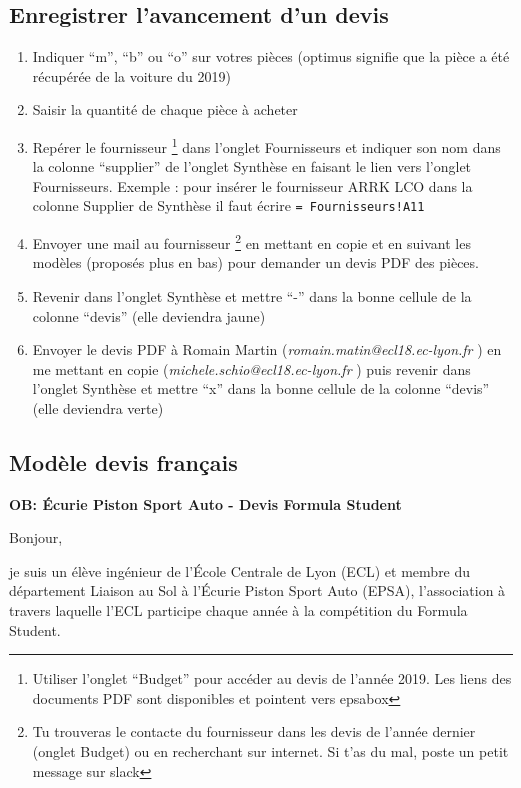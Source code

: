 \subsection{Enregistrer l'avancement d'un devis}
\begin{enumerate}
	\item Indiquer “m”, “b” ou “o” sur votres pièces (optimus signifie que la pièce a été récupérée de la voiture du 2019)
	\item Saisir la quantité de chaque pièce à acheter
	\item Repérer le fournisseur \footnote{Utiliser l’onglet “Budget” pour accéder au devis de l’année 2019. Les liens des documents PDF sont disponibles et pointent vers epsabox} dans l’onglet Fournisseurs et indiquer son nom dans la colonne 	“supplier” de l’onglet Synthèse en faisant le lien vers l’onglet Fournisseurs. Exemple​ : pour insérer le fournisseur ARRK LCO dans la colonne Supplier de Synthèse il faut écrire \texttt{=​ Fournisseurs!A11}
	\item Envoyer une mail au fournisseur \footnote{Tu trouveras le contacte du fournisseur dans les devis de l’année dernier (onglet Budget) ou en recherchant sur internet. Si t’as du mal, poste un petit message sur slack} en mettant en copie et en suivant les modèles (proposés
	plus en bas) pour demander un devis PDF des pièces.
	\item Revenir dans l’onglet Synthèse et mettre “-” dans la bonne cellule de la colonne “devis” (elle deviendra jaune)
\	\item Envoyer le devis PDF à Romain Martin (​\textit{ romain.matin@ecl18.ec-lyon.fr}​ ) en me mettant en copie (​ \textit{michele.schio@ecl18.ec-lyon.fr}​ ) puis revenir dans l’onglet Synthèse et mettre “x” dans la bonne cellule de la colonne “devis” (elle deviendra verte)
	
\end{enumerate}

\newpage
\subsection{Modèle devis français}
\textbf{OB: Écurie Piston Sport Auto - Devis Formula Student}

Bonjour,\\

\par je suis un élève ingénieur de l’École Centrale de Lyon (ECL) et membre du département Liaison au Sol à l’Écurie Piston Sport Auto (EPSA), l’association à travers laquelle l’ECL participe chaque
année à la compétition du Formula Student.

